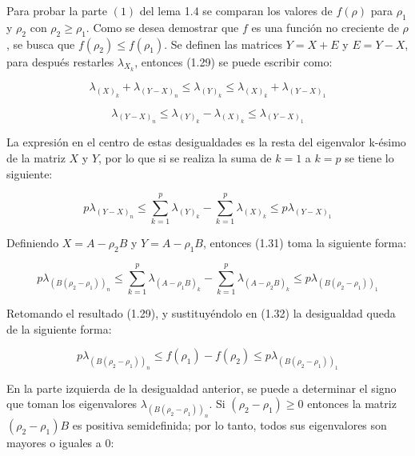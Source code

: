 Para probar la parte $(1)$ del lema 1.4 se comparan los valores de $f(\rho)$ para $\rho_1$ y $\rho_2$ con $\rho_2 \geq \rho_1$. Como se desea demostrar que $f$ es una función no creciente de $\rho$, se busca que $f(\rho_2) \leq f(\rho_1)$. Se definen las matrices $Y=X+E$ y $E = Y-X$, para después restarles $\lambda_{X_k}$, entonces (1.29) se puede escribir como:

\begin{equation*}
		\lambda_{(X)_k} +\lambda_{(Y-X)_n} \leq \lambda_{(Y)_k} \leq \lambda_{(X)_k} +\lambda_{(Y-X)_1}
\end{equation*}

\begin{equation*}
		\lambda_{(Y-X)_n} \leq \lambda_{(Y)_k} - \lambda_{(X)_k} \leq \lambda_{(Y-X)_1}
\end{equation*}

La expresión en el centro de estas desigualdades es la resta del eigenvalor k-ésimo de la matriz $X$ y $Y$, por lo que si se realiza la suma de $k = 1$ a $k = p$ se tiene lo siguiente:

\begin{equation}\label{eq:2.32}
		p \lambda_{(Y-X)_n} \leq \sum_{k=1}^{p} \lambda_{(Y)_k} - \sum_{k=1}^{p} \lambda_{(X)_k} \leq  p \lambda_{(Y-X)_1}
\end{equation}

Definiendo $X = A - \rho_2 B$ y $Y = A - \rho_1 B$, entonces (1.31) toma la siguiente forma:

\begin{equation}\label{eq:2.33}
    p \lambda_{(B(\rho_2-\rho_1))_n} \leq \sum_{k=1}^{p} \lambda_{(A - \rho_1 B)_k} - \sum_{k=1}^{p} \lambda_{(A - \rho_2 B)_k} \leq  p \lambda_{(B(\rho_2-\rho_1))_1}
\end{equation}

Retomando el resultado (1.29), y sustituyéndolo en (1.32) la desigualdad queda de la siguiente forma:

\begin{equation}\label{eq:2.34}
		p \lambda_{(B (\rho_2 - \rho_1))_n} \leq f(\rho_1) - f(\rho_2) \leq  p \lambda_{(B (\rho_2 - \rho_1))_1}
\end{equation}


En la parte izquierda de la desigualdad anterior, se puede a determinar el signo que toman los eigenvalores $\lambda_{(B (\rho_2 - \rho_1))_n}$. 
Si $(\rho_2- \rho_1) \geq 0$ entonces la matriz $(\rho_2 - \rho_1)B$ es positiva semidefinida; por lo tanto, todos sus eigenvalores son mayores o iguales a 0:

